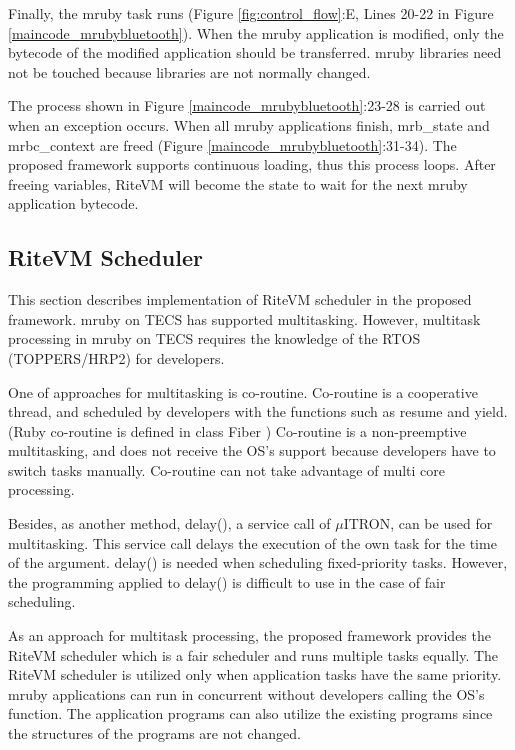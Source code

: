 \documentclass{sig-alternate-05-2015}
\begin{document}
Finally, the mruby task runs (Figure \ref{fig:control_flow}:E, Lines 20-22 in Figure \ref{maincode_mrubybluetooth}).
When the mruby application is modified, only the bytecode of the modified application should be transferred.
mruby libraries need not be touched because libraries are not normally changed.

The process shown in Figure \ref{maincode_mrubybluetooth}:23-28 is carried out when an exception occurs.
When all mruby applications finish, mrb\_state and mrbc\_context are freed (Figure \ref{maincode_mrubybluetooth}:31-34).
The proposed framework supports continuous loading, thus this process loops.
After freeing variables, RiteVM will become the state to wait for the next mruby application bytecode.
\subsection{RiteVM Scheduler}
\label{sec:RiteVM Scheduler}
This section describes implementation of RiteVM scheduler in the proposed framework.
mruby on TECS has supported multitasking.
However, multitask processing in mruby on TECS requires the knowledge of the RTOS (TOPPERS/HRP2) for developers.

One of approaches for multitasking is co-routine.
Co-routine is a cooperative thread, and scheduled by developers with the functions such as {\myit resume} and {\myit yield}. 
(Ruby co-routine is defined in class Fiber \cite{url:co-routine})
Co-routine is a non-preemptive multitasking, and does not receive the OS's support because developers have to switch tasks manually.
Co-routine can not take advantage of multi core processing.

Besides, as another method, {\myit delay()}, a service call of $\mu$ITRON, can be used for multitasking.
This service call delays the execution of the own task for the time of the argument.
{\myit delay()} is needed when scheduling fixed-priority tasks.
However, the programming applied to {\myit delay()} is difficult to use in the case of fair scheduling.

As an approach for multitask processing, the proposed framework provides the RiteVM scheduler which is a fair scheduler and runs multiple tasks equally.
The RiteVM scheduler is utilized only when application tasks have the same priority.
mruby applications can run in concurrent without developers calling the OS's function.
The application programs can also utilize the existing programs since the structures of the programs are not changed. 
\end{document}
